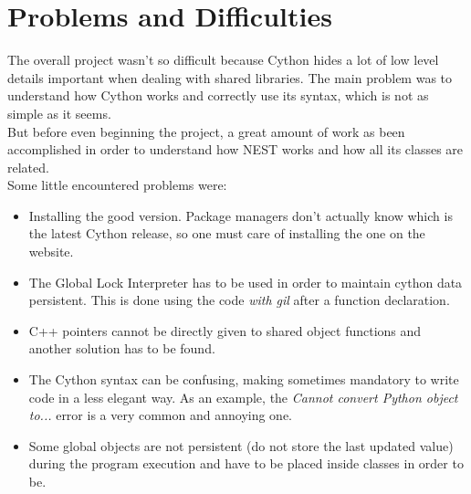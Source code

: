 \documentclass{article}
\begin{document}
\section{Problems and Difficulties}
The overall project wasn't so difficult because Cython hides a lot of low level details important when dealing with shared libraries. The main problem was to understand how Cython works and correctly use its syntax, which is not as simple as it seems.\\
But before even beginning the project, a great amount of work as been accomplished in order to understand how NEST works and how all its classes are related.\\
Some little encountered problems were:
\begin{itemize}
\item Installing the good version. Package managers don't actually know which is the latest Cython release, so one must care of installing the one on the website.
\item The Global Lock Interpreter has to be used in order to maintain cython data persistent. This is done using the code \emph{with gil} after a function declaration.
\item C++ pointers cannot be directly given to shared object functions and another solution has to be found.
\item The Cython syntax can be confusing, making sometimes mandatory to write code in a less elegant way. As an example, the \emph{Cannot convert Python object to...} error is a very common and annoying one.
\item Some global objects are not persistent (do not store the last updated value) during the program execution and have to be placed inside classes in order to be.
\end{itemize}
\end{document}
